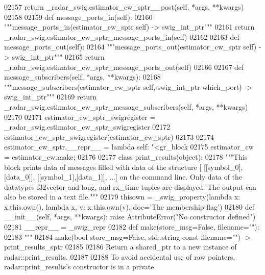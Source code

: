 \begin{DoxyCode}
{{{{{{{{02157         \textcolor{keywordflow}{return} \_radar\_swig.estimator\_cw\_sptr\_\_post(self, *args, **kwargs)
02158 
02159     \textcolor{keyword}{def }message_ports_in(self):
02160         \textcolor{stringliteral}{"""message\_ports\_in(estimator\_cw\_sptr self) -> swig\_int\_ptr"""}
02161         \textcolor{keywordflow}{return} \_radar\_swig.estimator\_cw\_sptr\_message\_ports\_in(self)
02162 
02163     \textcolor{keyword}{def }message_ports_out(self):
02164         \textcolor{stringliteral}{"""message\_ports\_out(estimator\_cw\_sptr self) -> swig\_int\_ptr"""}
02165         \textcolor{keywordflow}{return} \_radar\_swig.estimator\_cw\_sptr\_message\_ports\_out(self)
02166 
02167     \textcolor{keyword}{def }message_subscribers(self, *args, **kwargs):
02168         \textcolor{stringliteral}{"""message\_subscribers(estimator\_cw\_sptr self, swig\_int\_ptr which\_port) -> swig\_int\_ptr"""}
02169         \textcolor{keywordflow}{return} \_radar\_swig.estimator\_cw\_sptr\_message\_subscribers(self, *args, **kwargs)
02170 
02171 estimator\_cw\_sptr\_swigregister = \_radar\_swig.estimator\_cw\_sptr\_swigregister
02172 estimator_cw_sptr_swigregister(estimator\_cw\_sptr)
02173 
02174 estimator\_cw\_sptr.\_\_repr\_\_ = \textcolor{keyword}{lambda} self: \textcolor{stringliteral}{"<gr\_block %
02175 estimator\_cw = estimator\_cw.make;
02176 
02177 \textcolor{keyword}{class }print_results(object):
02178     \textcolor{stringliteral}{"""This block prints data of messages filled with data of the structure [ [[symbol\_0],[data\_0]],
       [[symbol\_1],[data\_1]], ...] on the command line. Only data of the datatypes f32vector and long, and rx\_time tuples
       are displayed. The output can also be stored in a text file."""}
02179     thisown = _swig_property(\textcolor{keyword}{lambda} x: x.this.own(), \textcolor{keyword}{lambda} x, v: x.this.own(v), doc=\textcolor{stringliteral}{'The membership flag'})
02180     \textcolor{keyword}{def }__init__(self, *args, **kwargs): \textcolor{keywordflow}{raise} AttributeError(\textcolor{stringliteral}{"No constructor defined"})
02181     \_\_repr\_\_ = \_swig\_repr
02182     \textcolor{keyword}{def }make(store\_msg=False, filename=""):
02183         \textcolor{stringliteral}{"""}
02184 \textcolor{stringliteral}{        make(bool store\_msg=False, std::string const filename="") -> print\_results\_sptr}
02185 \textcolor{stringliteral}{}
02186 \textcolor{stringliteral}{        Return a shared\_ptr to a new instance of radar::print\_results.}
02187 \textcolor{stringliteral}{}
02188 \textcolor{stringliteral}{        To avoid accidental use of raw pointers, radar::print\_results's constructor is in a private
}}}}}}}}}}
\end{DoxyCode}

